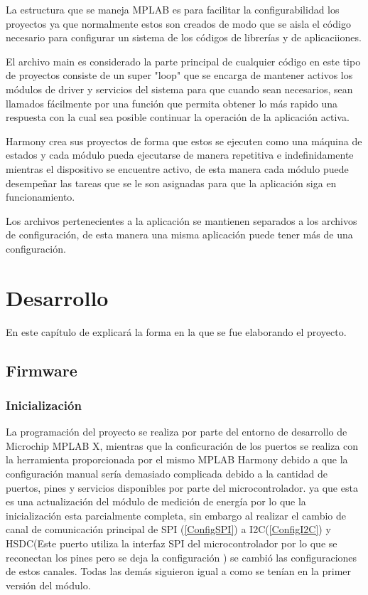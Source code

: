 \documentclass[letterpaper,12pt,oneside]{book}
\begin{document}
			La estructura que se maneja MPLAB es para facilitar la configurabilidad los proyectos ya que normalmente estos son creados de modo que se aisla el código necesario para configurar un sistema de los códigos de librerías y de aplicaciiones.

			El archivo main es considerado la parte principal de cualquier código en este tipo de proyectos consiste de un super "loop" que se encarga de mantener activos los módulos de driver y servicios del sistema para que cuando sean necesarios, sean llamados fácilmente por una función que permita obtener lo más rapido una respuesta con la cual sea posible continuar la operación de la aplicación activa. 

			Harmony crea sus proyectos de forma que estos se ejecuten como una máquina de estados y cada módulo pueda ejecutarse de manera repetitiva e indefinidamente mientras el dispositivo se encuentre activo, de esta manera cada módulo puede desempeñar las tareas que se le son asignadas para que la aplicación siga en funcionamiento.

			Los archivos pertenecientes a la aplicación se mantienen separados a los archivos de configuración, de esta manera una misma aplicación puede tener más de una configuración.

	\chapter{Desarrollo}
		En este capítulo de explicará la forma en la que se fue elaborando el proyecto.

		\section{Firmware}
			\subsection{Inicialización}
			La programación del proyecto se realiza por parte del entorno de desarrollo de Microchip MPLAB X, mientras que la conficuración de los puertos se realiza con la herramienta proporcionada por el mismo MPLAB Harmony debido a que la configuración manual sería demasiado complicada debido a la cantidad de puertos, pines y servicios disponibles por parte del microcontrolador. ya que esta es una actualización del módulo de medición de energía por lo que la inicialización esta parcialmente completa, sin embargo al realizar el cambio de canal de comunicación principal de SPI (\ref{ConfigSPI}) a I2C(\ref{ConfigI2C}) y HSDC(Este puerto utiliza la interfaz SPI del microcontrolador por lo que se reconectan los pines pero se deja la configuración ) se cambió las configuraciones de estos canales. Todas las demás siguieron igual a como se tenían en la primer versión del módulo.
\end{document}
